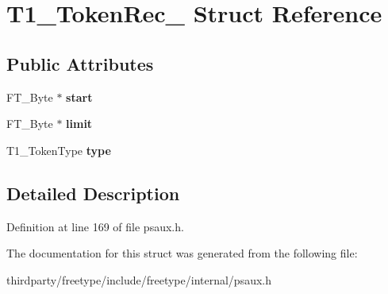 \hypertarget{struct_t1___token_rec__}{}\section{T1\+\_\+\+Token\+Rec\+\_\+ Struct Reference}
\label{struct_t1___token_rec__}
\subsection*{Public Attributes}
\begin{DoxyCompactItemize}
\item 
\mbox{\label{struct_t1___token_rec___a1b365e2910220eabf05f925f45bc98d6}} 
F\+T\+\_\+\+Byte $\ast$ {\bfseries start}
\item 
\mbox{\label{struct_t1___token_rec___aacd035f0dfbc47b7e1c7eefbe2c2080c}} 
F\+T\+\_\+\+Byte $\ast$ {\bfseries limit}
\item 
\mbox{\label{struct_t1___token_rec___a88b3b889e74609be1827ead4093a2d52}} 
T1\+\_\+\+Token\+Type {\bfseries type}
\end{DoxyCompactItemize}


\subsection{Detailed Description}


Definition at line 169 of file psaux.\+h.



The documentation for this struct was generated from the following file\+:\begin{DoxyCompactItemize}
\item 
thirdparty/freetype/include/freetype/internal/psaux.\+h\end{DoxyCompactItemize}
